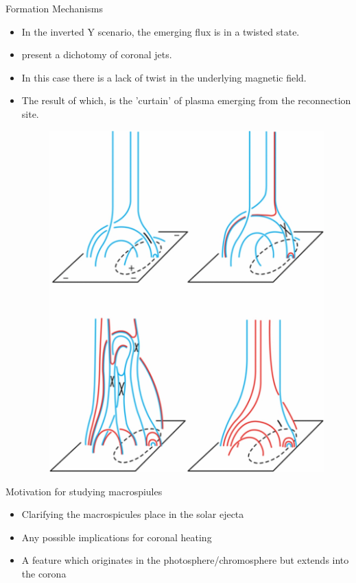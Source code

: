 \documentclass{beamer}
\begin{document}
	\begin{frame}{Formation Mechanisms}
		\begin{itemize}
			\item{In the inverted Y scenario, the emerging flux is in a twisted state.}
			\item{\cite{Moore2010} present a dichotomy of coronal jets.}
			\item{In this case there is a lack of twist in the underlying magnetic field.}
			\item{The result of which, is the 'curtain' of plasma emerging from the reconnection site.}
			\begin{figure}
				\includegraphics[scale=0.2]{Figs/blowout_jet.png}
				\caption{\cite{Moore2010}}
			\end{figure}
		\end{itemize}
	\end{frame}
	
	
	\begin{frame}{Motivation for studying macrospiules}
		\begin{itemize}
			\item{Clarifying the macrospicules place in the solar ejecta}
			\item{Any possible implications for coronal heating}
			\item{A feature which originates in the photosphere/chromosphere but extends into the corona}
		\end{itemize}
	\end{frame}		
\end{document}
